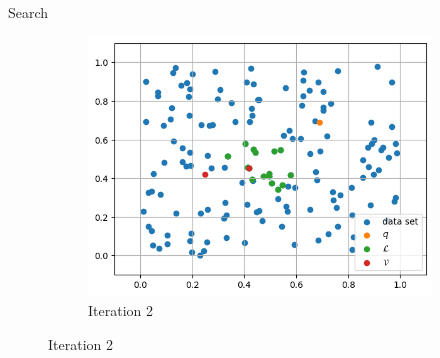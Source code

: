 \begin{frame}{Search}
\begin{figure}[h]
\begin{subfigure}{0.31\textwidth}
            \includegraphics[width=\textwidth]{images/greedy-search-2}
            \caption{Iteration 2}
        \end{subfigure}
        \hfill
    \end{figure}
\end{frame}

